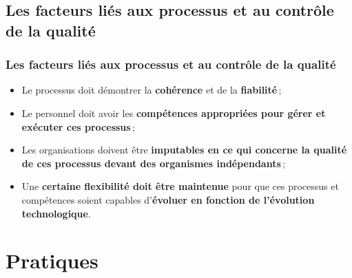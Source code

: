 \documentclass{beamer}
\begin{document}
			\subsection{Les facteurs liés aux processus et au contrôle de la qualité} 
			\begin{frame}
			 	\frametitle{Les facteurs liés aux processus et au contrôle de la qualité \citep{authority2014a}}
				
				\begin {itemize}
					\item Le processus doit démontrer la \textbf{cohérence} et de la \textbf{fiabilité}\,;
					\item Le personnel doit avoir les \textbf{compétences appropriées pour gérer et exécuter ces processus}\,;
					\item Les organisations doivent être \textbf{imputables en ce qui concerne la qualité de ces processus devant des organismes indépendants}\,;
					\item Une \textbf{certaine flexibilité doit être maintenue} pour que ces processus et compétences soient capables d'\textbf{évoluer en fonction de l'évolution technologique}.
					
				\end{itemize}
			\end{frame}
			
			
	\section{Pratiques} 
			
\end{document}
